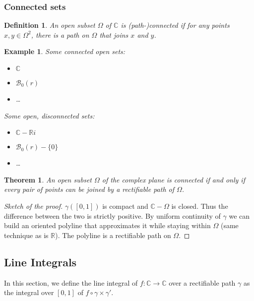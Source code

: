 \documentclass{article}
\newtheorem*{defi}{Definition}
\newtheorem*{example}{Example}
\newtheorem*{thm*}{Theorem}
\begin{document}
\subsubsection{Connected sets}

\begin{defi}
    An open subset $\Omega$ of $\mathbb{C}$ is (path-)connected if for any points $x,y \in \Omega^2$, there is a path on $\Omega$ that joins $x$ and $y$. 
\end{defi}

\begin{example}
    
    Some connected open sets:
    \begin{itemize}
        \item $\mathbb{C}$
        \item $\mathcal{B}_0(r)$
        \item \dots
    \end{itemize}
    Some open, disconnected sets:
    \begin{itemize}
        \item $\mathbb{C} -\mathbb{R}i$
        \item $\mathcal{B}_0(r) - \lbrace 0 \rbrace$
        \item \dots
    \end{itemize}
\end{example}

\begin{thm*}
    An open subset $\Omega$ of the complex plane is connected if and only if every pair of points can be joined by a rectifiable path of $\Omega$.
\end{thm*}

\begin{proof}[Sketch of the proof]
    $\gamma([0,1])$ is compact and $\mathbb{C} - \Omega$ is closed. Thus the difference between the two is strictly positive. By uniform continuity of $\gamma$ we can build an oriented polyline that approximates it while staying within $\Omega$ (same technique as is $\mathbb{R}$). The polyline is a rectifiable path on $\Omega$.
\end{proof}

\subsection{Line Integrals}
In this section, we define the line integral of $f:\mathbb{C} \rightarrow \mathbb{C}$ over a rectifiable path $\gamma$ as the integral over $[0,1]$ of $f\circ\gamma \times \gamma'$.
\end{document}
